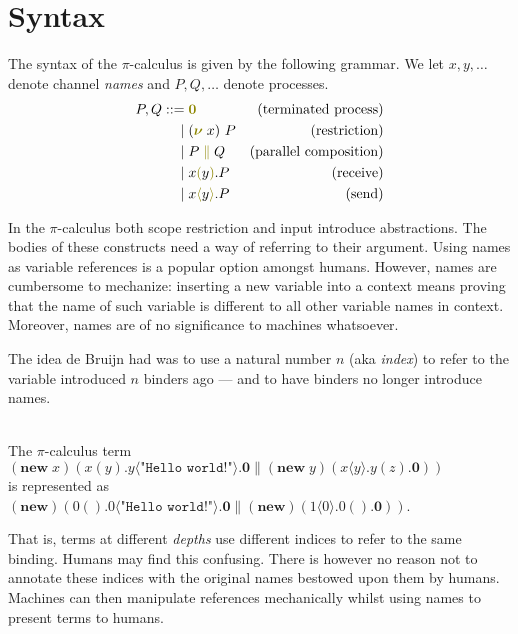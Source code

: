\documentclass[a4paper,UKenglish,cleveref, autoref, thm-restate,authorcolumns]{lipics-v2019}
\theoremstyle{definition}
\newcommand{\picalc}{$\pi$-calculus}
\newcommand{\constr}[1]{\textcolor{olive}{\operatorname{#1}}}
\newcommand{\PO}{\constr{\mathbf{0}}}
\newcommand{\comp}[2]{#1 \; \constr{\parallel} \; #2}
\newcommand{\new}{\constr{\boldsymbol{\nu}} \;}
\newcommand{\recvp}[2]{#1 \constr{(}#2\constr{)}}
\begin{document}
\section{Syntax}
\label{syntax}
The syntax of the \picalc{} \cite{Sangio01} is given by the following grammar.
We let $x, y,\ldots$ denote channel \emph{names} and
$P, Q,\ldots$ denote processes.
\begin{equation*}
  \begin{split}
    P,Q ::=      & \; \PO       &\text{(terminated process)}  \\
                |& \; (\new{}x)\  P   & \text{(restriction)} \\
                |& \; \comp{P}{Q}  & \text{(parallel composition)} \\
                |& \; \recvp{x}{y}.P  & \text{(receive)} \\
                |& \; \sendp{x}{y}.P   &\text{(send)}
  \end{split}
\end{equation*}

In the \picalc{} both scope restriction and input introduce abstractions.
The bodies of these constructs need a way of referring to their argument.
Using names as variable references is a popular option amongst humans.
However, names are cumbersome to mechanize: inserting a new variable into a context means proving that the name of such variable is different to all other variable names in context.
Moreover, names are of no significance to machines whatsoever.

The idea de Bruijn had \cite{} was to use a natural number $n$ (aka \emph{index}) to refer to the variable introduced $n$ binders ago --- and to have binders no longer introduce names.
\begin{example}
\hfill{}\\
The \picalc{} term \hfill{} $(\textbf{new} \; x) (x ( y ) . y \langle \texttt{"Hello world!"} \rangle . \mathbf{0} \parallel (\textbf{new} \; y) (x \langle y \rangle . y ( z ) .\mathbf{0}))$ \\ is represented as \hfill{} $(\textbf{new}) (0 () . 0 \langle \texttt{"Hello world!"} \rangle . \mathbf{0} \parallel (\textbf{new}) (1 \langle 0 \rangle . 0 () . \mathbf{0}))$.
\end{example}
That is, terms at different \emph{depths} use different indices to refer to the same binding.
Humans may find this confusing.
There is however no reason not to annotate these indices with the original names bestowed upon them by humans.
Machines can then manipulate references mechanically whilst using names to present terms to humans.
\end{document}
